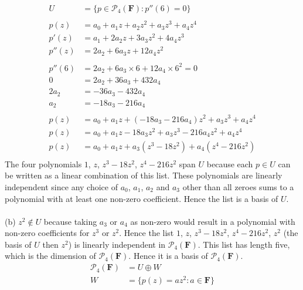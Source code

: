 \documentclass{article}
\begin{document}
\Large
\begin{align*}
\tag{a}
U &= \{p \in \mathcal{P}_4(\textbf{F}) : p''(6) = 0\} \\
\\
      p(z) &= a_0 + a_1z + a_2z^2 + a_3z^3 + a_4z^4 \\
     p'(z) &= a_1 + 2a_2z + 3a_3z^2 + 4a_4z^3 \\
    p''(z) &= 2a_2 + 6a_3z + 12a_4z^2 \\
\\
    p''(6) &= 2a_2 + 6a_3\times 6 + 12a_4\times 6^2 = 0 \\
            0 &= 2a_2 + 36a_3 + 432a_4 \\
         2a_2 &= -36a_3 - 432a_4 \\
          a_2 &= -18a_3 - 216a_4 \\
\\
      p(z) &= a_0 + a_1z + (-18a_3 - 216a_4)z^2 + a_3z^3 + a_4z^4 \\
      p(z) &= a_0 + a_1z - 18a_3z^2 + a_3z^3 - 216a_4z^2 + a_4z^4 \\
      p(z) &= a_0 + a_1z + a_3(z^3 - 18z^2) + a_4(z^4 - 216z^2) \\
\end{align*}
The four polynomials $1$, $z$, $z^3 - 18z^2$, $z^4 - 216z^2$ span $U$ because each $p \in U$ can be written as a linear combination of this list.
These polynomials are linearly independent since any choice of $a_0$, $a_1$, $a_2$ and $a_3$ other than all zeroes sums to a polynomial with at least one non-zero coefficient.
Hence the list is a basis of $U$.
\\
\\
(b) $z^2 \notin U$ because taking $a_3$ or $a_4$ as non-zero would result in a polynomial with non-zero coefficients for $z^3$ or $z^2$.
Hence the list $1$, $z$, $z^3 - 18z^2$, $z^4 - 216z^2$, $z^2$ (the basis of $U$ then $z^2$) is linearly independent in $\mathcal{P}_4(\textbf{F})$.
This list has length five, which is the dimension of $\mathcal{P}_4(\textbf{F})$. Hence it is a basis of $\mathcal{P}_4(\textbf{F})$.
\begin{align*}
\tag{c}
\mathcal{P}_4(\textbf{F}) &= U \oplus W \\
W &= \{ p(z) = az^2 : a \in \textbf{F} \} \\
\end{align*}
\end{document}
